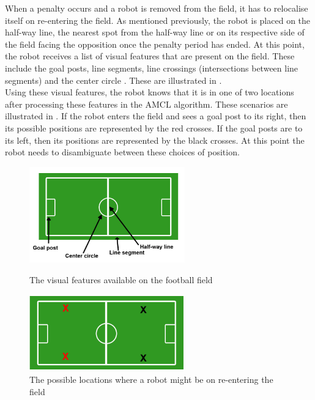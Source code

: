 \documentclass{report}
\begin{document}
When a penalty occurs and a robot is removed from the field, it has to relocalise itself on re-entering the field. As mentioned previously, the robot is placed on the half-way line, the nearest spot from the half-way line or on its respective side of the field facing the opposition once the penalty period has ended. At this point, the robot receives a list of visual features that are present on the field. These include the goal posts, line segments, line crossings (intersections between line segments) and the center circle \cite{Bhuman}. These are illustrated in .\\

Using these visual features, the robot knows that it is in one of two locations after processing these features in the AMCL algorithm. These scenarios are illustrated in . If the robot enters the field and sees a goal post to its right, then its possible positions are represented by the red crosses. If the goal posts are to its left, then its positions are represented by the black crosses. At this point the robot needs to disambiguate between these choices of position.\\

\begin{figure}[ht!]
\begin{minipage}[b]{0.5\linewidth}
  \centering
    \includegraphics[width=0.6\textwidth]{../Drawings/localisation/goalSetup.jpg}
    \caption{The visual features available on the football field} 
    \label{fig:features}
\end{minipage}
\begin{minipage}[b]{0.5\linewidth}
  \centering
    \includegraphics[width=0.6\textwidth]{../Drawings/localisation/possibleLocations.jpg}
    \caption{The possible locations where a robot might be on re-entering the field} 
    \label{fig:location}
\end{minipage}
\end{figure}
\end{document}
